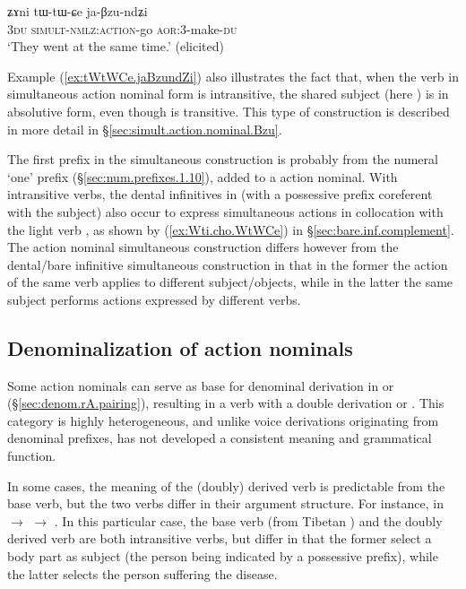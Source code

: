 \begin{exe}
\ex \label{ex:tWtWCe.jaBzundZi}
\gll ʑɤni tɯ-tɯ-ɕe ja-βzu-ndʑi \\
\textsc{3du} \textsc{simult}-\textsc{nmlz}:\textsc{action}-go \textsc{aor}:3\flobv{}-make-\textsc{du} \\
\glt `They went at the same time.' (elicited)
 \end{exe}
 
 Example (\ref{ex:tWtWCe.jaBzundZi}) also illustrates the fact that, when the verb in simultaneous action nominal form is intransitive, the shared subject (here ) is in absolutive form, even though  is transitive. This type of construction is described in more detail in §\ref{sec:simult.action.nominal.Bzu}.

The first  prefix in the simultaneous construction is probably from the numeral  `one' prefix (§\ref{sec:num.prefixes.1.10}), added to a  action nominal. With intransitive verbs, the dental infinitives in  (with a possessive prefix coreferent with the subject) also occur to express simultaneous actions in collocation with the light verb , as shown by (\ref{ex:Wti.cho.WtWCe}) in §\ref{sec:bare.inf.complement}. The action nominal simultaneous construction differs however from the dental/bare infinitive simultaneous construction in that in the former the action of the same verb applies to different subject/objects, while in the latter the same subject performs actions expressed by different verbs.

\subsection{Denominalization of action nominals}  \label{sec:denominalization.action.nominal}
Some  action nominals can serve as base for denominal derivation in  or  (§\ref{sec:denom.rA.pairing}), resulting in a verb with a double derivation  or . This category is highly heterogeneous, and unlike voice derivations originating from denominal prefixes, has not developed a consistent meaning and grammatical function.

In some cases, the meaning of the (doubly) derived verb is predictable from the base verb, but the two verbs differ in their argument structure. For instance, in  $\rightarrow$  $\rightarrow$ . In this particular case, the base verb (from Tibetan ) and the doubly derived verb  are both intransitive verbs, but differ in that the former select a body part as subject (the person being indicated by a possessive prefix), while the latter selects the person suffering the disease.

